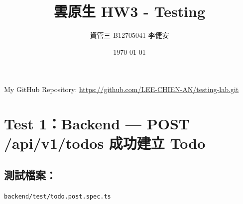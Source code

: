 \documentclass[11pt,a4paper]{article}
\begin{document}
\title{雲原生 HW3 - Testing}
\author{資管三 B12705041 李倢安}
\date{\today}
\maketitle
My GitHub Repository: \url{https://github.com/LEE-CHIEN-AN/testing-lab.git}

\section*{Test 1：Backend — POST /api/v1/todos 成功建立 Todo}

\subsection*{測試檔案：} 
\texttt{backend/test/todo.post.spec.ts}
\end{document}
